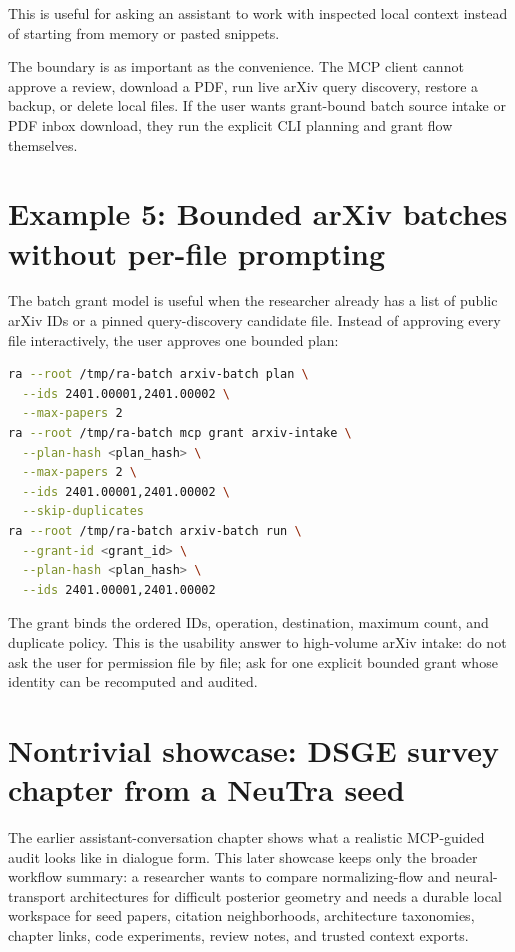 \documentclass[11pt,a4paper,openany]{book}
\begin{document}
This is useful for asking an assistant to work with inspected local context
instead of starting from memory or pasted snippets.

The boundary is as important as the convenience. The MCP client cannot approve a
review, download a PDF, run live arXiv query discovery, restore a backup, or
delete local files. If the user wants grant-bound batch source intake or PDF
inbox download, they run the explicit CLI planning and grant flow themselves.

\section{Example 5: Bounded arXiv batches without per-file prompting}

The batch grant model is useful when the researcher already has a list of public
arXiv IDs or a pinned query-discovery candidate file. Instead of approving every
file interactively, the user approves one bounded plan:

\begin{lstlisting}[language=bash]
ra --root /tmp/ra-batch arxiv-batch plan \
  --ids 2401.00001,2401.00002 \
  --max-papers 2
ra --root /tmp/ra-batch mcp grant arxiv-intake \
  --plan-hash <plan_hash> \
  --max-papers 2 \
  --ids 2401.00001,2401.00002 \
  --skip-duplicates
ra --root /tmp/ra-batch arxiv-batch run \
  --grant-id <grant_id> \
  --plan-hash <plan_hash> \
  --ids 2401.00001,2401.00002
\end{lstlisting}

The grant binds the ordered IDs, operation, destination, maximum count, and
duplicate policy. This is the usability answer to high-volume arXiv intake: do
not ask the user for permission file by file; ask for one explicit bounded grant
whose identity can be recomputed and audited.

\section{Nontrivial showcase: DSGE survey chapter from a NeuTra seed}

The earlier assistant-conversation chapter shows what a realistic MCP-guided audit
looks like in dialogue form. This later showcase keeps only the broader workflow
summary: a researcher wants to compare normalizing-flow and
neural-transport architectures for difficult posterior geometry and needs a durable local
workspace for seed papers, citation neighborhoods, architecture taxonomies,
chapter links, code experiments, review notes, and trusted context exports.
\end{document}
